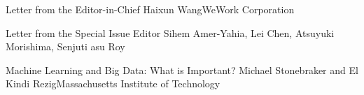 \documentclass[11pt]{article}
\begin{document}


\begin{bulletin}


%
%

\begin{lettersection}


\begin{letter}{Letter from the Editor-in-Chief}
{Haixun Wang}{WeWork Corporation}

\end{letter}
%
\newpage
%
%
\begin{letter}{Letter from the Special Issue Editor}
{Sihem Amer-Yahia, Lei Chen, Atsuyuki Morishima, Senjuti asu Roy}
{}


\end{letter}

\end{lettersection}


\begin{opinionsection}
\begin{opinion}{Machine Learning and Big Data: What is Important?}
{Michael Stonebraker and El Kindi Rezig}{Massachusetts Institute of Technology}

\end{opinion}
\end{opinionsection}


\end{bulletin}
\end{document}
